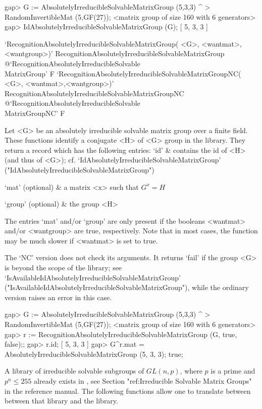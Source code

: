 \beginexample
gap> G := AbsolutelyIrreducibleSolvableMatrixGroup (5,3,3) ^
>         RandomInvertibleMat (5,GF(27));  
<matrix group of size 160 with 6 generators> 
gap> IdAbsolutelyIrreducibleSolvableMatrixGroup (G); 
[ 5, 3, 3 ]
\endexample


\>`RecognitionAbsolutelyIrreducibleSolvableMatrixGroup(%
   <G>, <wantmat>, <wantgroup>)'%
{RecognitionAbsolutelyIrreducibleSolvableMatrixGroup}%
@{`RecognitionAbsolutelyIrreducibleSolvable\\MatrixGroup'} F
\>`RecognitionAbsolutelyIrreducibleSolvableMatrixGroupNC(%
   <G>, <wantmat>,<wantgroup>)'%
{RecognitionAbsolutelyIrreducibleSolvableMatrixGroupNC}%
@{`RecognitionAbsolutelyIrreducibleSolvable\\MatrixGroupNC'} F

Let <G> be an absolutely irreducible solvable matrix group over a finite field. 
These functions identify a conjugate <H> of <G> group in the library. 
They return a record which has the following entries:
\beginitems
`id' &  contains the id of <H> (and thus of
<G>); cf. `IdAbsolutelyIrreducibleSolvableMatrixGroup'
("IdAbsolutelyIrreducibleSolvableMatrixGroup")

`mat' (optional) &
a
matrix <x> such that $G^x = H$

`group' (optional) & the group <H> 

\enditems
The entries `mat' and/or `group' are only present if the booleans <wantmat> and/or
<wantgroup> are true, respectively. Note that in most cases, the function may 
be much slower if <wantmat> is set to true.  

The `NC' version does not check its arguments. It returns `fail' if
the group <G> is beyond the scope of the {\IRREDSOL} library; see
`IsAvailableIdAbsolutelyIrreducibleSolvableMatrixGroup'
("IsAvailableIdAbsolutelyIrreducibleSolvableMatrixGroup"), while the
ordinary version raises an error in this case.

\beginexample
gap> G := AbsolutelyIrreducibleSolvableMatrixGroup (5,3,3) ^
>         RandomInvertibleMat (5,GF(27)); 
<matrix group of size 160 with 6 generators>
gap> r := RecognitionAbsolutelyIrreducibleSolvableMatrixGroup (G, true, false);;
gap> r.id;
[ 5, 3, 3 ]
gap> G^r.mat = AbsolutelyIrreducibleSolvableMatrixGroup (5, 3, 3);
true;
\endexample


A library of irreducible solvable subgroups of $GL(n, p)$, where $p$ is a 
prime and $p^n \leq 255$ already exists in {\GAP}, see Section "ref:Irreducible Solvable Matrix Groups" in the {\GAP} reference manual. The following functions
allow one to translate between between that library and the {\IRREDSOL} library. 


